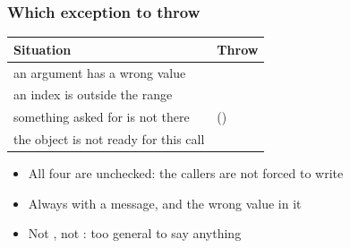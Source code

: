 \documentclass[aspectratio=169,10pt,compress]{beamer}
\begin{document}
\begin{frame}[t,fragile] \frametitle{Which exception to throw}


\begin{table}
		\small
		\begin{tabular}{@{}L{0.42\textwidth}L{0.50\textwidth}@{}}
			\toprule
			\textbf{Situation} & \textbf{Throw} \\
			\midrule
			an argument has a wrong value                    &  \\
			an index is outside the range                     &  \\
			something asked for is not there                  &  () \\
			the object is not ready for this call              &  \\
			\bottomrule
		\end{tabular}
\end{table}%


	\vspace{0.5em}
	\begin{itemize}\small
		\item All four are unchecked: the callers are not forced to write 
		\item Always with a message, and the wrong value in it
		\item Not , not : too general to say anything
	\end{itemize}
\end{frame}




\end{document}
